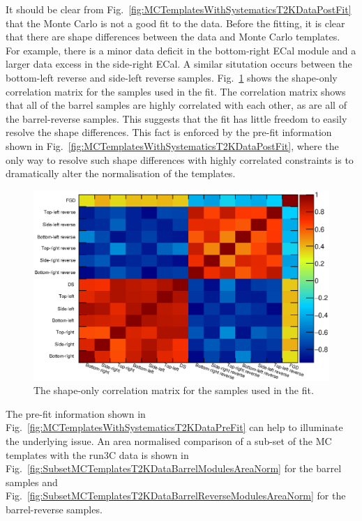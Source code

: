 \newline
\newline
It should be clear from Fig.~\ref{fig:MCTemplatesWithSystematicsT2KDataPostFit} that the Monte Carlo is not a good fit to the data.  Before the fitting, it is clear that there are shape differences between the data and Monte Carlo templates.  For example, there is a minor data deficit in the bottom-right ECal module and a larger data excess in the side-right ECal.  A similar situtation occurs between the bottom-left reverse and side-left reverse samples.  Fig.~\ref{fig:ShapeCorrelationMatrix} shows the shape-only correlation matrix for the samples used in the fit.  The correlation matrix shows that all of the barrel samples are highly correlated with each other, as are all of the barrel-reverse samples.  This suggests that the fit has little freedom to easily resolve the shape differences.  This fact is enforced by the pre-fit information shown in Fig.~\ref{fig:MCTemplatesWithSystematicsT2KDataPostFit}, where the only way to resolve such shape differences with highly correlated constraints is to dramatically alter the normalisation of the templates. 
\begin{figure}
  \centering
  \includegraphics[width=15cm]{images/measurement/data/ShapeCorrelationMatrix.eps}
  \caption{The shape-only correlation matrix for the samples used in the fit.}
  \label{fig:ShapeCorrelationMatrix}
\end{figure}
The pre-fit information shown in Fig.~\ref{fig:MCTemplatesWithSystematicsT2KDataPreFit} can help to illuminate the underlying issue.  An area normalised comparison of a sub-set of the MC templates with the run3C data is shown in Fig.~\ref{fig:SubsetMCTemplatesT2KDataBarrelModulesAreaNorm} for the barrel samples and Fig.~\ref{fig:SubsetMCTemplatesT2KDataBarrelReverseModulesAreaNorm} for the barrel-reverse samples.  
